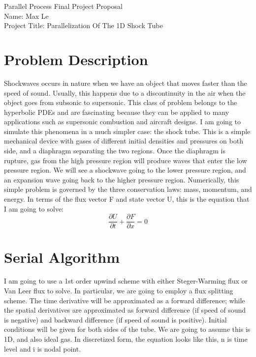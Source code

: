\documentclass{article}
\begin{document}
	\begin{flushleft} 
		Parallel Process Final Project Proposal \\ 
		Name: Max Le \\ 
		Project Title: Parallelization Of The 1D Shock Tube
	\end{flushleft}
		
	\section{Problem Description}
	Shockwaves occurs in nature when we have an object that moves faster than the speed of sound.  Usually, this happens due to a discontinuity in the air when the object goes from subsonic to supersonic.  This class of problem belongs to the hyperbolic PDEs and are fascinating because they can be applied to many applications such as supersonic combustion and aircraft designs.  I am going to simulate this phenomena in a much simpler case: the shock tube.  This is a simple mechanical device with gases of different initial densities and pressures on both side, and a diaphragm separating the two regions.  Once the diaphragm is rupture, gas from the high pressure region will produce waves that enter the low pressure region.  We will see a shockwave going to the lower pressure region, and an expansion wave going back to the higher pressure region.  Numerically, this simple problem is governed by the three conservation laws: mass, momentum, and energy.  In terms of the flux vector F and state vector U, this is the equation that I am going to solve: 
	\begin{equation}
		\dfrac{\partial U}{\partial t} + \dfrac{\partial F}{\partial x} = 0
	\end{equation}
	
	\section{Serial Algorithm}
	I am going to use a 1st order upwind scheme with either Steger-Warming flux or Van Leer flux to solve. In particular, we are going to employ a flux splitting scheme.  The time derivative will be approximated as a forward difference; while the spatial derivatives are approximated as forward difference (if speed of sound is negative) and backward difference (if speed of sound is positive). Initial conditions will be given for both sides of the tube.  We are going to assume this is 1D, and also ideal gas.  In discretized form, the equation looks like this, n is time level and i is nodal point. 
	
\end{document}
